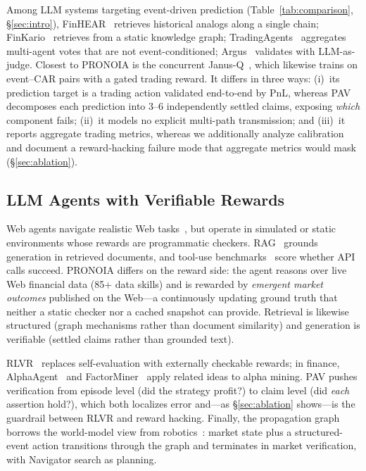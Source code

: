 \documentclass[sigconf, anonymous, review]{acmart}
\begin{document}
Among LLM systems targeting event-driven prediction (Table~\ref{tab:comparison}, \S\ref{sec:intro}), FinHEAR~\cite{finhear2025} retrieves historical analogs along a single chain; FinKario~\cite{finkario2025} retrieves from a static knowledge graph; TradingAgents~\cite{tradingagents2024} aggregates multi-agent votes that are not event-conditioned; Argus~\cite{argus2026} validates with LLM-as-judge. Closest to PRONOIA is the concurrent Janus-Q~\cite{janusq2026}, which likewise trains on event--CAR pairs with a gated trading reward. It differs in three ways: (i)~its prediction target is a trading action validated end-to-end by PnL, whereas PAV decomposes each prediction into 3--6 independently settled claims, exposing \emph{which} component fails; (ii)~it models no explicit multi-path transmission; and (iii)~it reports aggregate trading metrics, whereas we additionally analyze calibration and document a reward-hacking failure mode that aggregate metrics would mask (\S\ref{sec:ablation}).

\subsection{LLM Agents with Verifiable Rewards}

Web agents navigate realistic Web tasks~\cite{webarena2023, workarena2024, visualwebarena2024}, but operate in simulated or static environments whose rewards are programmatic checkers. RAG~\cite{rag2020} grounds generation in retrieved documents, and tool-use benchmarks~\cite{toolbench2023, api2023} score whether API calls succeed. PRONOIA differs on the reward side: the agent reasons over live Web financial data (85+ data skills) and is rewarded by \emph{emergent market outcomes} published on the Web---a continuously updating ground truth that neither a static checker nor a cached snapshot can provide. Retrieval is likewise structured (graph mechanisms rather than document similarity) and generation is verifiable (settled claims rather than grounded text).

RLVR~\cite{rlvr2025} replaces self-evaluation with externally checkable rewards; in finance, AlphaAgent~\cite{alphaagent2025} and FactorMiner~\cite{factorminer2026} apply related ideas to alpha mining. PAV pushes verification from episode level (did the strategy profit?) to claim level (did \emph{each} assertion hold?), which both localizes error and---as \S\ref{sec:ablation} shows---is the guardrail between RLVR and reward hacking. Finally, the propagation graph borrows the world-model view from robotics~\cite{ha2018, schrittwieser2020}: market state plus a structured-event action transitions through the graph and terminates in market verification, with Navigator search as planning.
\end{document}
